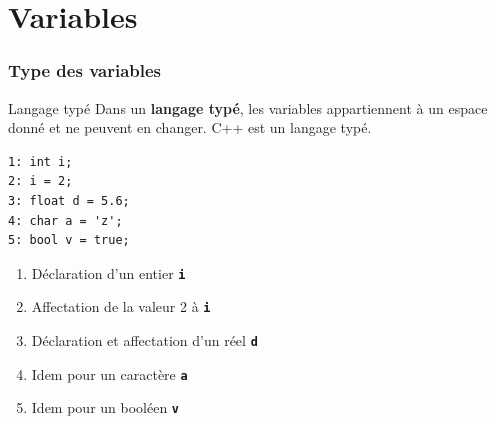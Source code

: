 
\subtitle{Variables, tests, boucles et fonctions}
\date{}
\maketitle

\section{Variables}

\begin{frame}[fragile]
	\frametitle{Type des variables}
	\begin{block}{Langage typé}
        Dans un \textbf{langage typé}, les variables appartiennent à un espace donné et ne peuvent en changer. C++ est un langage typé.
	\end{block}
	\vfill
	\begin{minipage}{0.38\linewidth}
		\begin{verbatim}
1: int i;
2: i = 2;
3: float d = 5.6;
4: char a = 'z';
5: bool v = true;
		\end{verbatim}
	\end{minipage}
	\hfill
	\begin{minipage}{0.58\linewidth}
		\begin{enumerate}
			\item Déclaration d'un entier \texttt{\textbf{i}}
            \item Affectation de la valeur 2 à \texttt{\textbf{i}}
			\item Déclaration et affectation d'un réel \texttt{\textbf{d}}
            \item Idem pour un caractère \texttt{\textbf{a}}
            \item Idem pour un booléen \texttt{\textbf{v}}
		\end{enumerate}
	\end{minipage}
\end{frame}

